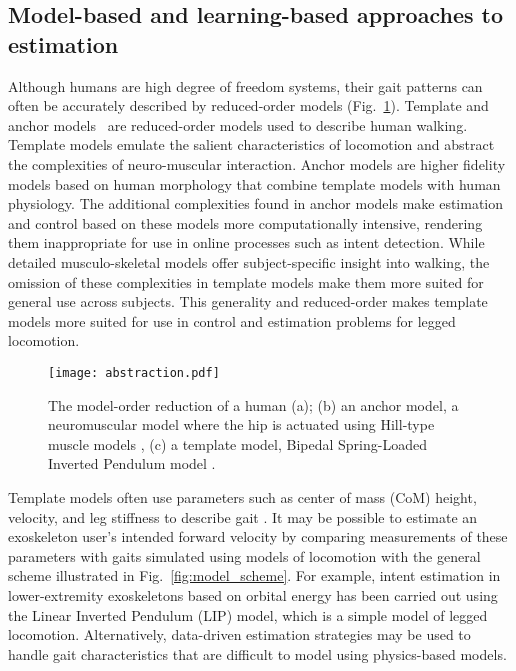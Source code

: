 \subsection{Model-based and learning-based approaches to estimation}\label{sec:model_v_learning}
Although humans are high degree of freedom systems, their gait patterns can often be accurately described by reduced-order models (Fig.~\ref{fig:abstraction}). Template and anchor models~\cite{full1999templates} are reduced-order models used to describe human walking. Template models emulate the salient characteristics of locomotion and abstract the complexities of neuro-muscular interaction. Anchor models are higher fidelity models based on human morphology that combine template models with human physiology. The additional complexities found in anchor models make estimation and control based on these models more computationally intensive, rendering them inappropriate for use in online processes such as intent detection. While detailed musculo-skeletal models offer subject-specific insight into walking, the omission of these complexities in template models make them more suited for general use across subjects. This generality and reduced-order makes template models more suited for use in control and estimation problems for legged locomotion.

\begin{figure}
	\centering
	\texttt{[image: abstraction.pdf]}
	\caption[The model-order reduction of a human (a); (b) an anchor model, a neuromuscular model where the hip is actuated using Hill-type muscle models, (c) a template model, Bipedal Spring-Loaded Inverted Pendulum model]{The model-order reduction of a human (a); (b) an anchor model, a neuromuscular model where the hip is actuated using Hill-type muscle models \cite{davoodi2019template}, (c) a template model, Bipedal Spring-Loaded Inverted Pendulum model \cite{geyer2006compliant}. }\label{fig:abstraction}
\end{figure}


Template models often use parameters such as center of mass (CoM) height, velocity, and leg stiffness to describe gait \cite{geyer2006compliant,liu2015dynamic,full1999templates,sharbafi2015fmch}. It may be possible to estimate an exoskeleton user's intended forward velocity by comparing measurements of these parameters with gaits simulated using models of locomotion with the general scheme illustrated in Fig.~\ref{fig:model_scheme}. For example, intent estimation in lower-extremity exoskeletons based on orbital energy \cite{chen2018dynamic} has been carried out using the Linear Inverted Pendulum (LIP) model, which is a simple model of legged locomotion.  Alternatively, data-driven estimation strategies \cite{ge2011neural, kalinowska2019data, joukov2017rhythmic} may be used to handle gait characteristics that are difficult to model using physics-based models.
%


